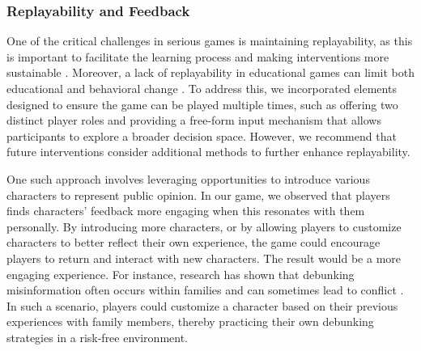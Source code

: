 \subsubsection {Replayability and Feedback}
One of the critical challenges in serious games is maintaining replayability, as this is important to facilitate the learning process \cite{adetunji2024unlocking} and making interventions more sustainable \cite{silveira2016open}. Moreover, a lack of replayability in educational games can limit both educational and behavioral change \cite{epstein2021tabletop}. To address this, we incorporated elements designed to ensure the game can be played multiple times, such as offering two distinct player roles and providing a free-form input mechanism that allows participants to explore a broader decision space. However, we recommend that future interventions consider additional methods to further enhance replayability.

One such approach involves leveraging opportunities to introduce various characters to represent public opinion. In our game, we observed that players finds characters' feedback more engaging when this resonates with them personally. By introducing more characters, or by allowing players to customize characters to better reflect their own experience, the game could encourage players to return and interact with new characters. The result would be a more engaging experience. For instance, research has shown that debunking misinformation often occurs within families and can sometimes lead to conflict \cite{scott2023figured}. In such a scenario, players could customize a character based on their previous experiences with family members, thereby practicing their own debunking strategies in a risk-free environment.

